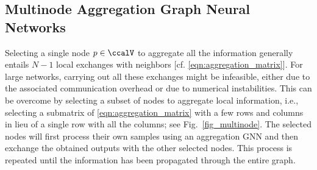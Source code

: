 \subsection{Multinode Aggregation Graph Neural Networks}\label{sec_aggregation_multinode}

Selecting a single node $p \in \ccalV$ to aggregate all the information generally entails $N-1$ local exchanges with neighbors [cf. \eqref{eqn:aggregation_matrix}]. For large networks, carrying out all these exchanges might be infeasible, either due to the associated communication overhead or due to numerical instabilities. This can be overcome by selecting a subset of nodes to aggregate local information, i.e., selecting a submatrix of \eqref{eqn:aggregation_matrix} with a few rows and columns in lieu of a single row with all the columns; see Fig.~\ref{fig_multinode}. The selected nodes will first process their own samples using an aggregation GNN and then exchange the obtained outputs with the other selected nodes. This process is repeated until the information has been propagated through the entire graph. 

